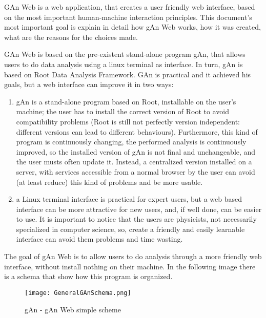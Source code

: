 GAn Web is a web application, that creates a user friendly web interface, based on the most important human-machine interaction principles.
This document's most important goal is explain in detail how gAn Web works, how it was created, what are the reasons for the choices made. 

GAn Web is based on the pre-existent stand-alone program gAn, that allows users to do data analysis using a linux terminal as interface. In turn, gAn is based on Root Data Analysis Framework. GAn is practical and it achieved his goals, but a web interface can improve it in two ways:

\begin{enumerate}

\item gAn is a stand-alone program based on Root, installable on the user's machine; the user has to install the correct version of Root to avoid compatibility problems (Root is still not perfectly version independent: different versions can lead to different behaviours). Furthermore, this kind of program is continuously changing, the performed analysis is continuously improved, so the installed version of gAn is not final and unchangeable, and the user musts often update it. Instead, a centralized version installed on a server, with services accessible from a normal browser by the user can avoid (at least reduce) this kind of problems and be more usable.    
 

\item a Linux terminal interface is practical for expert users, but a web based interface can be more attractive for new users, and, if well done, can be easier to use. It is important to notice that the users are physicists, not necessarily specialized in computer science, so, create a friendly and easily learnable interface can avoid them problems and time wasting.   


\end{enumerate}


The goal of gAn Web is to allow users to do analysis through a more friendly web interface, without install nothing on their machine. In the following image there is a schema that show how this program is organized.

\begin{figure}[H]
\centering
\texttt{[image: GeneralGAnSchema.png]} 
\caption{gAn - gAn Web simple scheme}
\end{figure}

